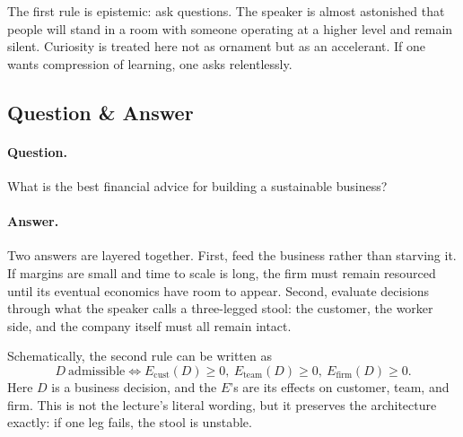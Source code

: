 The first rule is epistemic: ask questions. The speaker is almost astonished that people will stand in a room with someone operating at a higher level and remain silent. Curiosity is treated here not as ornament but as an accelerant. If one wants compression of learning, one asks relentlessly.

\subsection{Question \& Answer}

\paragraph{Question.} What is the best financial advice for building a sustainable business?

\paragraph{Answer.} Two answers are layered together. First, feed the business rather than starving it. If margins are small and time to scale is long, the firm must remain resourced until its eventual economics have room to appear. Second, evaluate decisions through what the speaker calls a three-legged stool: the customer, the worker side, and the company itself must all remain intact.

Schematically, the second rule can be written as
\begin{equation}
D\ \text{admissible}
\iff
E_{\mathrm{cust}}(D)\ge 0,\ 
E_{\mathrm{team}}(D)\ge 0,\ 
E_{\mathrm{firm}}(D)\ge 0.
\end{equation}
Here \(D\) is a business decision, and the \(E\)'s are its effects on customer, team, and firm. This is not the lecture's literal wording, but it preserves the architecture exactly: if one leg fails, the stool is unstable.

\begin{figure}[h]
\centering
{}
\end{figure}

